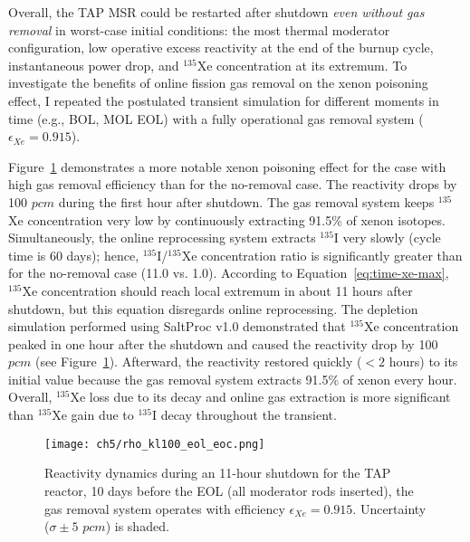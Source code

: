 
Overall, the \gls{TAP} \gls{MSR} could be restarted after shutdown \emph{even 
without gas removal} in worst-case initial conditions: the most thermal 
moderator configuration, low operative excess reactivity at the end of the 
burnup cycle, instantaneous power drop, and $^{135}$Xe concentration at its 
extremum. To investigate the benefits of online fission gas removal on the 
xenon poisoning effect, I repeated the postulated transient simulation for 
different moments in time (e.g., \gls{BOL}, MOL \gls{EOL}) with a fully 
operational gas removal system ($\epsilon_{Xe}=0.915$). 

Figure~\ref{fig:lf-tap-rho-kl100-eol-eoc} demonstrates a more notable xenon 
poisoning effect for the case with high gas removal efficiency than for 
the no-removal case. The reactivity drops by 100 $pcm$ during the 
first hour after shutdown. The gas removal system keeps $^{135}$Xe 
concentration very low by continuously extracting 91.5\% of xenon isotopes. 
Simultaneously, the online reprocessing system extracts $^{135}$I very slowly 
(cycle time is 60 days); hence, $^{135}$I/$^{135}$Xe concentration ratio is 
significantly greater than for the no-removal case (11.0 vs. 1.0). According 
to Equation~\ref{eq:time-xe-max}, $^{135}$Xe concentration should reach local 
extremum in about 11 hours after shutdown, but this equation disregards online 
reprocessing. The depletion simulation performed using SaltProc v1.0 
demonstrated that $^{135}$Xe concentration peaked in one hour after the 
shutdown and caused the reactivity drop by 100 $pcm$ (see 
Figure~\ref{fig:lf-tap-rho-kl100-eol-eoc}). Afterward, 
the reactivity restored quickly ($<2$ hours) to its initial value because 
the gas removal system extracts 91.5\% of xenon every hour. Overall, 
$^{135}$Xe loss due to its decay and online gas extraction is more significant 
than $^{135}$Xe gain due to $^{135}$I decay throughout the transient.
\begin{figure}[htp!] %
	\centering
	\texttt{[image: ch5/rho\_kl100\_eol\_eoc.png]}
	\vspace{-5mm}
	\caption{Reactivity dynamics during an 11-hour shutdown for the 
		\gls{TAP} reactor, 10 days before the \gls{EOL} (all moderator rods 
		inserted), the gas removal system operates with efficiency 
		$\epsilon_{Xe}=0.915$. Uncertainty ($\sigma\pm5$ $pcm$) is 
		shaded.}
	\label{fig:lf-tap-rho-kl100-eol-eoc}
\end{figure}

